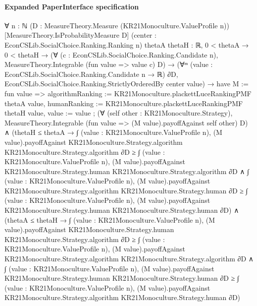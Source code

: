 \documentclass[10pt]{article}
\begin{document}
\paragraph{Expanded PaperInterface specification}
\begin{ReviewVerbatim}
∀ {n : ℕ} (D : MeasureTheory.Measure (KR21Monoculture.ValueProfile n)) [MeasureTheory.IsProbabilityMeasure D]
  (center : EconCSLib.SocialChoice.Ranking.Ranking n) {thetaA thetaH : ℝ},
  0 < thetaA →
    0 < thetaH →
      (∀ (c : EconCSLib.SocialChoice.Ranking.Candidate n), MeasureTheory.Integrable (fun value => value c) D) →
        (∀ᵐ (value : EconCSLib.SocialChoice.Ranking.Candidate n → ℝ) ∂D,
            EconCSLib.SocialChoice.Ranking.StrictlyOrderedBy center value) →
          have M := fun value =>
            { algorithmRanking := KR21Monoculture.plackettLuceRankingPMF thetaA value,
              humanRanking := KR21Monoculture.plackettLuceRankingPMF thetaH value, value := value };
          (∀ (self other : KR21Monoculture.Strategy),
              MeasureTheory.Integrable (fun value => (M value).payoffAgainst self other) D) ∧
            (thetaH ≤ thetaA →
                ∫ (value : KR21Monoculture.ValueProfile n),
                      (M value).payoffAgainst KR21Monoculture.Strategy.algorithm KR21Monoculture.Strategy.algorithm ∂D ≥
                    ∫ (value : KR21Monoculture.ValueProfile n),
                      (M value).payoffAgainst KR21Monoculture.Strategy.human KR21Monoculture.Strategy.algorithm ∂D ∧
                  ∫ (value : KR21Monoculture.ValueProfile n),
                      (M value).payoffAgainst KR21Monoculture.Strategy.algorithm KR21Monoculture.Strategy.human ∂D ≥
                    ∫ (value : KR21Monoculture.ValueProfile n),
                      (M value).payoffAgainst KR21Monoculture.Strategy.human KR21Monoculture.Strategy.human ∂D) ∧
              (thetaA ≤ thetaH →
                ∫ (value : KR21Monoculture.ValueProfile n),
                      (M value).payoffAgainst KR21Monoculture.Strategy.human KR21Monoculture.Strategy.algorithm ∂D ≥
                    ∫ (value : KR21Monoculture.ValueProfile n),
                      (M value).payoffAgainst KR21Monoculture.Strategy.algorithm KR21Monoculture.Strategy.algorithm ∂D ∧
                  ∫ (value : KR21Monoculture.ValueProfile n),
                      (M value).payoffAgainst KR21Monoculture.Strategy.human KR21Monoculture.Strategy.human ∂D ≥
                    ∫ (value : KR21Monoculture.ValueProfile n),
                      (M value).payoffAgainst KR21Monoculture.Strategy.algorithm KR21Monoculture.Strategy.human ∂D)
\end{ReviewVerbatim}
\end{document}
